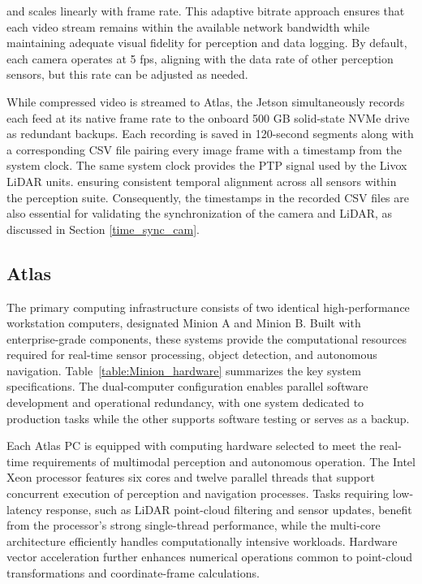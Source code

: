 \documentclass{erauthesis}
\begin{document}
and scales linearly with frame rate.
This adaptive bitrate approach ensures that each video stream remains within the available network bandwidth while maintaining adequate visual fidelity for perception and data logging.
By default, each camera operates at 5 \ac{fps}, aligning with the data rate of other perception sensors, but this rate can be adjusted as needed. %



While compressed video is streamed to Atlas, the Jetson simultaneously records each feed at its native frame rate to the onboard 500 GB solid-state NVMe drive as redundant backups. 
Each recording is saved in 120-second segments along with a corresponding \ac{CSV} file pairing every image frame with a timestamp from the system clock. 
The same system clock provides the \ac{PTP} signal used by the Livox LiDAR units. ensuring consistent temporal alignment across all sensors within the perception suite. 
Consequently, the timestamps in the recorded \ac{CSV} files are also essential for validating the synchronization of the camera and LiDAR, as discussed in Section \ref{time_sync_cam}.



\subsection{Atlas} \label{atlas}

The primary computing infrastructure consists of two identical high-performance workstation computers, designated Minion A and Minion B.  
Built with enterprise-grade components, these systems provide the computational resources required for real-time sensor processing, object detection, and autonomous navigation.
Table~\ref{table:Minion_hardware} summarizes the key system specifications.
The dual-computer configuration enables parallel software development and operational redundancy, with one system dedicated to production tasks while the other supports software testing or serves as a backup.
 

Each Atlas PC is equipped with computing hardware selected to meet the real-time requirements of multimodal perception and autonomous operation.  
The Intel Xeon processor features six cores and twelve parallel threads that support concurrent execution of perception and navigation processes.  
Tasks requiring low-latency response, such as LiDAR point-cloud filtering and sensor updates, benefit from the processor’s strong single-thread performance, while the multi-core architecture efficiently handles computationally intensive workloads.  
Hardware vector acceleration further enhances numerical operations common to point-cloud transformations and coordinate-frame calculations.
\end{document}
